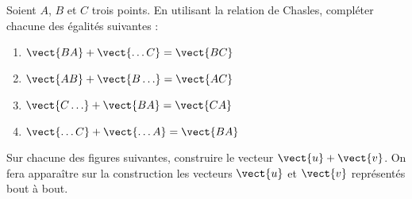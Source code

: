\documentclass[a4paper,dvipsnames]{article}
\begin{document}
\begin{multicols}{2}
\begin{enumerate}
  \end{enumerate}
\end{multicols}

\bigskip

\exo[2 points] Soient $A$, $B$ et $C$ trois points. En utilisant la relation de Chasles, compléter chacune des égalités suivantes :
\begin{multicols}{4}
  \begin{enumerate}
    \item $\vect{BA}+\vect{\hdots C}=\vect{BC}$
    \item $\vect{AB}+\vect{\vphantom{A}B\hdots}=\vect{AC}$
    \item $\vect{C\hdots}+\vect{BA}=\vect{CA}$
    \item $\vect{\hdots C}+\vect{\hdots A}=\vect{BA}$
  \end{enumerate}
\end{multicols}

\bigskip

\exo[2 points] Sur chacune des figures suivantes, construire le vecteur $\vect{u}+\vect{v}$. On fera apparaître sur la construction les vecteurs $\vect{u}$ et $\vect{v}$ représentés \og{}bout à bout\fg{}.

\medskip
\end{document}
